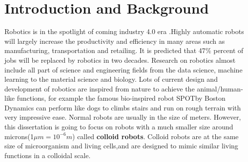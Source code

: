\chapter{Introduction and Background}
Robotics is in the spotlight of coming industry 4.0 era \cite{lasi2014industry}.Highly automatic robots will largely increase the productivity and efficiency in many areas such as manufacturing, transportation and retailing. 
It is predicted that 47$\%$ percent of jobs will be replaced by robotics in two decades. \cite{frey2013future}
Research on robotics almost include all part of science and engineering fields from the data science, machine learning to the material science and biology. Lots of current design and development of robotics are inspired from nature to achieve the animal/human-like functions, for example  the famous  bio-inspired robot SPOT\textregistered  by Boston Dynamics \cite{yang2019ten} can perform like dogs  to climbs stairs and run on rough terrain with very impressive ease. Normal robots are usually in the size of meters. However, this dissertation is going to focus on robots with a much smaller size around microns(1$\mu m=10^{-6} m$) called \textbf{colloid robots}. Colloid robots are at the same size of microorganism and living cells,and are designed to mimic similar living functions in a colloidal scale.  

